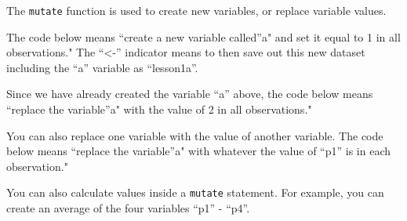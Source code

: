 \documentclass[]{book}
\newenvironment{Shaded}{\begin{snugshade}}{\end{snugshade}}
\newcommand{\DataTypeTok}[1]{\textcolor[rgb]{0.13,0.29,0.53}{#1}}
\newcommand{\DecValTok}[1]{\textcolor[rgb]{0.00,0.00,0.81}{#1}}
\newcommand{\KeywordTok}[1]{\textcolor[rgb]{0.13,0.29,0.53}{\textbf{#1}}}
\newcommand{\NormalTok}[1]{#1}
\newcommand{\OperatorTok}[1]{\textcolor[rgb]{0.81,0.36,0.00}{\textbf{#1}}}
\newcommand{\StringTok}[1]{\textcolor[rgb]{0.31,0.60,0.02}{#1}}
\begin{document}
The \texttt{mutate} function is used to create new variables, or replace
variable values.

The code below means ``create a new variable called''a" and set it equal
to 1 in all observations." The ``\textless-'' indicator means to then
save out this new dataset including the ``a'' variable as ``lesson1a''.

\begin{Shaded}
\end{Shaded}

Since we have already created the variable ``a'' above, the code below
means ``replace the variable''a" with the value of 2 in all
observations."

\begin{Shaded}
\end{Shaded}

You can also replace one variable with the value of another variable.
The code below means ``replace the variable''a" with whatever the value
of ``p1'' is in each observation."

\begin{Shaded}
\end{Shaded}

You can also calculate values inside a \texttt{mutate} statement. For
example, you can create an average of the four variables ``p1'' -
``p4''.

\begin{Shaded}
\end{Shaded}
\end{document}
